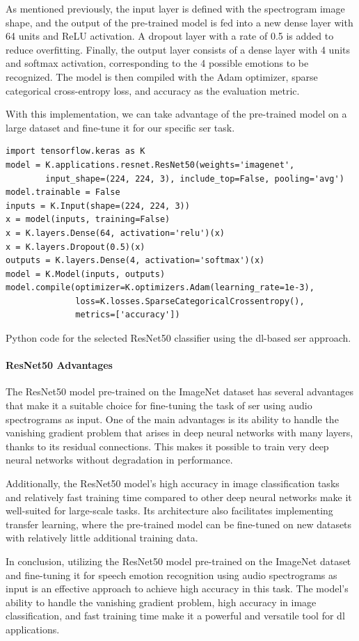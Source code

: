 As mentioned previously, the input layer is defined with the spectrogram image shape, and the output of the pre-trained model is fed into a new dense layer with 64 units and ReLU activation. A dropout layer with a rate of 0.5 is added to reduce overfitting. Finally, the output layer consists of a dense layer with 4 units and softmax activation, corresponding to the 4 possible emotions to be recognized. The model is then compiled with the Adam optimizer, sparse categorical cross-entropy loss, and accuracy as the evaluation metric.

With this implementation, we can take advantage of the pre-trained model on a large dataset and fine-tune it for our specific \ac{ser} task.

\begin{listing}[H]
	\begin{verbatim}
import tensorflow.keras as K
model = K.applications.resnet.ResNet50(weights='imagenet',
		input_shape=(224, 224, 3), include_top=False, pooling='avg')
model.trainable = False
inputs = K.Input(shape=(224, 224, 3))
x = model(inputs, training=False)
x = K.layers.Dense(64, activation='relu')(x)
x = K.layers.Dropout(0.5)(x)
outputs = K.layers.Dense(4, activation='softmax')(x)
model = K.Model(inputs, outputs)
model.compile(optimizer=K.optimizers.Adam(learning_rate=1e-3),
			  loss=K.losses.SparseCategoricalCrossentropy(),
			  metrics=['accuracy'])
	\end{verbatim}
	\caption{Python code for the selected ResNet50 classifier using the \ac{dl}-based \ac{ser} approach.}
	\label{dl:code}
\end{listing}


\paragraph{ResNet50 Advantages}

The ResNet50 model pre-trained on the ImageNet dataset has several advantages that make it a suitable choice for fine-tuning the task of \ac{ser} using audio spectrograms as input. One of the main advantages is its ability to handle the vanishing gradient problem that arises in deep neural networks with many layers, thanks to its residual connections. This makes it possible to train very deep neural networks without degradation in performance.

Additionally, the ResNet50 model's high accuracy in image classification tasks and relatively fast training time compared to other deep neural networks make it well-suited for large-scale tasks. Its architecture also facilitates implementing transfer learning, where the pre-trained model can be fine-tuned on new datasets with relatively little additional training data.

In conclusion, utilizing the ResNet50 model pre-trained on the ImageNet dataset and fine-tuning it for speech emotion recognition using audio spectrograms as input is an effective approach to achieve high accuracy in this task. The model's ability to handle the vanishing gradient problem, high accuracy in image classification, and fast training time make it a powerful and versatile tool for \ac{dl} applications.
